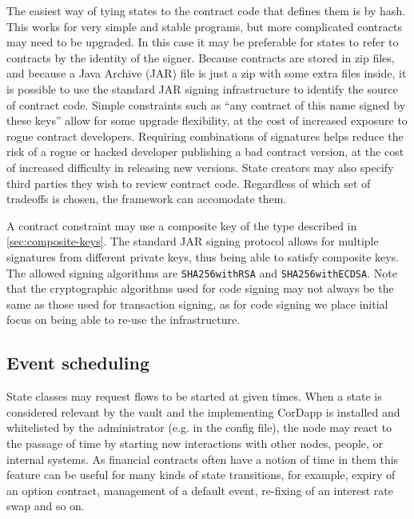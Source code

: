\documentclass{article}
\begin{document}
The easiest way of tying states to the contract code that defines them is by hash. This works for very simple
and stable programs, but more complicated contracts may need to be upgraded. In this case it may be preferable
for states to refer to contracts by the identity of the signer. Because contracts are stored in zip files, and
because a Java Archive (JAR) file is just a zip with some extra files inside, it is possible to use the standard
JAR signing infrastructure to identify the source of contract code. Simple constraints such as ``any contract of
this name signed by these keys'' allow for some upgrade flexibility, at the cost of increased exposure to rogue
contract developers. Requiring combinations of signatures helps reduce the risk of a rogue or hacked developer
publishing a bad contract version, at the cost of increased difficulty in releasing new versions. State creators
may also specify third parties they wish to review contract code. Regardless of which set of tradeoffs is chosen,
the framework can accomodate them.

A contract constraint may use a composite key of the type described in \cref{sec:composite-keys}. The standard JAR
signing protocol allows for multiple signatures from different private keys, thus being able to satisfy composite
keys. The allowed signing algorithms are \texttt{SHA256withRSA} and \texttt{SHA256withECDSA}. Note that the
cryptographic algorithms used for code signing may not always be the same as those used for transaction signing,
as for code signing we place initial focus on being able to re-use the infrastructure.


\subsection{Event scheduling}\label{sec:event-scheduling}

State classes may request flows to be started at given times. When a state is considered relevant by the vault and the
implementing CorDapp is installed and whitelisted by the administrator (e.g. in the config file), the node may react to
the passage of time by starting new interactions with other nodes, people, or internal systems. As financial contracts
often have a notion of time in them this feature can be useful for many kinds of state transitions, for example, expiry
of an option contract, management of a default event, re-fixing of an interest rate swap and so on.
\end{document}
